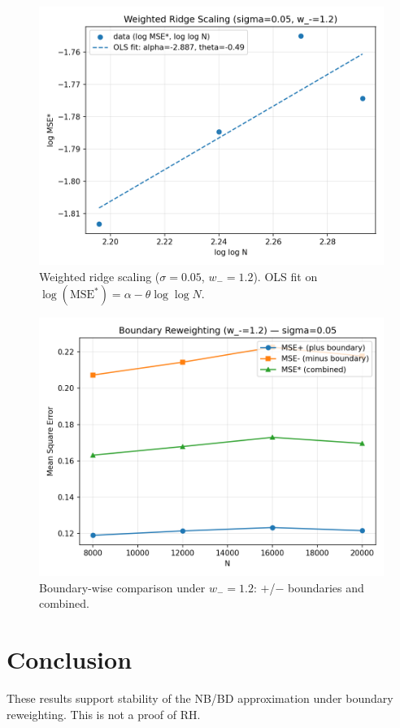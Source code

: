 \documentclass[11pt]{article}
\theoremstyle{remark}
\begin{document}
\begin{figure}[h]
  \centering
  \includegraphics[width=0.78\linewidth]{figures/weighted_scaling.png}
  \caption{Weighted ridge scaling ($\sigma=0.05$, $w_-=1.2$). OLS fit on $\log(\text{MSE}^*)=\alpha-\theta\log\log N$.}
\end{figure}

\begin{figure}[h]
  \centering
  \includegraphics[width=0.78\linewidth]{figures/boundary_reweighting.png}
  \caption{Boundary-wise comparison under $w_-=1.2$: $+$/$-$ boundaries and combined.}
\end{figure}

\section{Conclusion}
These results support stability of the NB/BD approximation under boundary reweighting. This is not a proof of RH.
\end{document}
